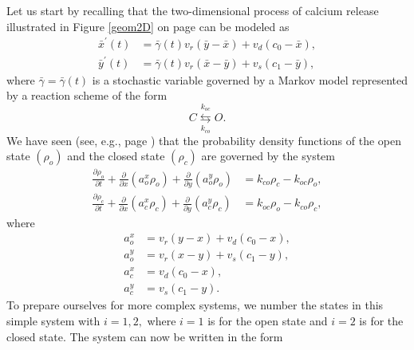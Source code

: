 Let us start by recalling that the two-dimensional process of calcium release
illustrated in Figure \ref{geom2D} on page \pageref{geom2D} can be modeled as
\begin{align}
\bar{x}^{\prime}(t)  &  =\bar{\gamma}(t)v_{r}\left(  \bar{y}-\bar{x}\right)
+v_{d}\left(  c_{0}-\bar{x}\right)  ,\label{c1g}\\
\bar{y}^{\prime}(t)  &  =\bar{\gamma}(t)v_{r}\left(  \bar{x}-\bar{y}\right)
+v_{s}\left(  c_{1}-\bar{y}\right)  , \label{c2g}%
\end{align}
where $\bar{\gamma}=\bar{\gamma}(t)$ is a stochastic variable governed by a
Markov model represented by a reaction scheme of the form%
\[
C\underset{k_{co}}{\overset{k_{oc}}{\leftrightarrows}}O.
\]
We have seen (see, e.g., page \pageref{eq:pdf21}) that the probability density
functions of the open state $(\rho_{o})$ and the closed state $(\rho_{c})$ are
governed by the system
\begin{align}
\frac{\partial\rho_{o}}{\partial t}+\frac{\partial}{\partial x}\left(
a_{o}^{x}\rho_{o}\right)  +\frac{\partial}{\partial y}\left(  a_{o}^{y}%
\rho_{o}\right)   &  =k_{co}\rho_{c}-k_{oc}\rho_{o},\label{eq:pdf21g}\\
\frac{\partial\rho_{c}}{\partial t}+\frac{\partial}{\partial x}\left(
a_{c}^{x}\rho_{c}\right)  +\frac{\partial}{\partial y}\left(  a_{c}^{y}%
\rho_{c}\right)   &  =k_{oc}\rho_{o}-k_{co}\rho_{c}, \label{eq:pdf22g}%
\end{align}
where
\begin{align}
a_{o}^{x}  &  =v_{r}\left(  y-x\right)  +v_{d}\left(  c_{0}-x\right)
,\nonumber\\
a_{o}^{y}  &  =v_{r}\left(  x-y\right)  +v_{s}\left(  c_{1}-y\right)
,\label{eq:fluxes2Dg}\\
a_{c}^{x}  &  =v_{d}\left(  c_{0}-x\right)  ,\nonumber\\
a_{c}^{y}  &  =v_{s}\left(  c_{1}-y\right)  .\nonumber
\end{align}
To prepare ourselves for more complex systems, we number the states
in this simple system with $i=1,2,$ where $i=1$ is for the open state and $i=2$ is for the closed state. The
system can now be written in the form%

